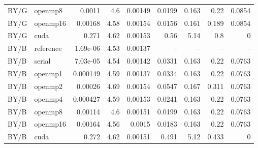 \documentclass[11pt]{article}
\begin{document}
\begin{longtable}{llrrrrrrr}
BY/G & openmp8 & 0.0011 & 4.6 & 0.00149 & 0.0199 & 0.163 & 0.22 & 0.0854\\
BY/G & openmp16 & 0.00168 & 4.58 & 0.00154 & 0.0156 & 0.161 & 0.189 & 0.0854\\
BY/G & cuda & 0.271 & 4.62 & 0.00153 & 0.56 & 5.14 & 0.8 & 0\\
BY/B & reference & 1.69e-06 & 4.53 & 0.00137 & -- & -- & -- & --\\
BY/B & serial & 7.03e-05 & 4.54 & 0.00142 & 0.0331 & 0.163 & 0.22 & 0.0763\\
BY/B & openmp1 & 0.000149 & 4.59 & 0.00137 & 0.0334 & 0.163 & 0.22 & 0.0763\\
BY/B & openmp2 & 0.00026 & 4.69 & 0.00154 & 0.0547 & 0.167 & 0.311 & 0.0763\\
BY/B & openmp4 & 0.000427 & 4.59 & 0.00153 & 0.0241 & 0.163 & 0.22 & 0.0763\\
BY/B & openmp8 & 0.00114 & 4.6 & 0.00151 & 0.0199 & 0.163 & 0.22 & 0.0763\\
BY/B & openmp16 & 0.00164 & 4.56 & 0.0015 & 0.0183 & 0.163 & 0.22 & 0.0763\\
BY/B & cuda & 0.272 & 4.62 & 0.00151 & 0.491 & 5.12 & 0.433 & 0\\
\bottomrule\end{longtable}\normalsize
\end{document}
